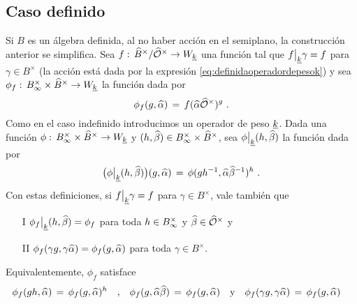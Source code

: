 \subsection{Caso definido}
Si $B$ es un \'{a}lgebra definida, al no haber acci\'{o}n en el semiplano, la
construcci\'{o}n anterior se simplifica. Sea
 $f:\,\widehat{B}^{\times}/\widehat{\mathcal{O}}^{\times}\rightarrow W_{\underline{k}}$ una funci\'{o}n tal
que $f\big|_{\underline{k}}{\gamma}=f$ para $\gamma\in B^{\times}$ (la
acci\'{o}n est\'{a} dada por la expresi\'{o}n
\eqref{eq:definidaoperadordepesok}) y sea
$\phi_{f}:\,{B}_{\infty}^{\times}\times\widehat{B}^{\times}\rightarrow W_{\underline{k}}$ la funci\'{o}n
dada por
\begin{equation}
	\label{eq:funcionadelicacorrespondientedefinida}
	\phi_{f}(g,\widehat{\alpha}) \,=\,f(\widehat{\alpha}\widehat{\mathcal{O}}^{\times})^{g}
	\text{ .}
\end{equation}
%
Como en el caso indefinido introducimos un operador de peso $\underline{k}$. Dada
una funci\'{o}n $\phi:\,{B}_{\infty}^{\times}\times\widehat{B}^{\times}\rightarrow W_{\underline{k}}$ y
$(h,\widehat{\beta})\in{B}_{\infty}^{\times}\times\widehat{B}^{\times}$, sea
$\phi\big|_{\underline{k}}{(h,\widehat{\beta})}$ la funci\'{o}n dada por
\begin{equation}
	\label{eq:adelicadefinidaoperadordepesok}
	\big(\phi\big|_{\underline{k}}{(h,\widehat{\beta})}\big)
		(g,\widehat{\alpha}) \,=\,
		\phi(gh^{-1},\widehat{\alpha}\widehat{\beta}^{-1})^{h}
	\text{ .}
\end{equation}
%
Con estas definiciones, si $f\big|_{\underline{k}}{\gamma}=f$ para
$\gamma\in B^{\times}$, vale tambi\'{e}n que
\begin{itemize}
	\item[I]
		\begin{math}
			\phi_{f}\big|_{\underline{k}}{(h,\widehat{\beta})}=
				\phi_{f}
		\end{math}
		para toda $h\in{B}_{\infty}^{\times}$ y $\widehat{\beta}\in\widehat{\mathcal{O}}^{\times}$ y
	\item[II]
		\begin{math}
			\phi_{f}(\gamma g,\gamma\widehat{\alpha})=
				\phi_{f}(g,\widehat{\alpha})
		\end{math}
		para toda $\gamma\in B^{\times}$.
\end{itemize}
%
Equivalentemente, $\phi_{f}$ satisface
\begin{align*}
	\phi_{f}(gh,\widehat{\alpha}) \,=\, \phi_{f}(g,\widehat{\alpha})^{h}
		& \quad\text{,}\quad
	\phi_{f}(g,\widehat{\alpha}\widehat{\beta})\,=\,\phi_{f}(g,\widehat{\alpha})
		\quad\text{y} \quad
	\phi_{f}(\gamma g,\gamma\widehat{\alpha}) \,=\,\phi_{f}(g,\widehat{\alpha})
\end{align*}
